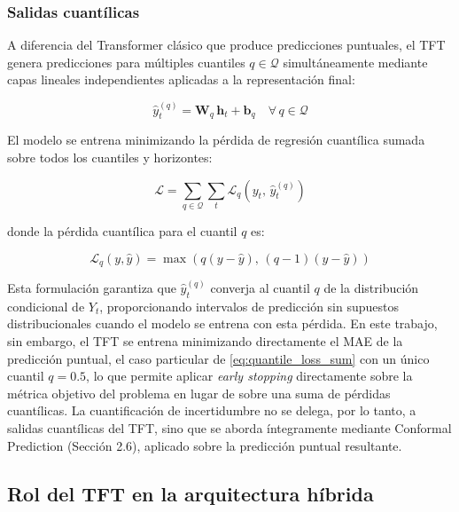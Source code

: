 \subsubsection{Salidas cuantílicas}

A diferencia del Transformer clásico que produce predicciones puntuales, el TFT genera predicciones para múltiples cuantiles $q \in \mathcal{Q}$ simultáneamente mediante capas lineales independientes aplicadas a la representación final:

\begin{equation}
\hat{y}_t^{(q)} = \mathbf{W}_q \, \mathbf{h}_t + \mathbf{b}_q \quad \forall\, q \in \mathcal{Q}
\end{equation}

El modelo se entrena minimizando la pérdida de regresión cuantílica sumada sobre todos los cuantiles y horizontes:

\begin{equation}
\mathcal{L} = \sum_{q \in \mathcal{Q}} \sum_{t} \mathcal{L}_q\left(y_t, \, \hat{y}_t^{(q)}\right)
\label{eq:quantile_loss_sum}
\end{equation}

donde la pérdida cuantílica para el cuantil $q$ es:

\begin{equation}
\mathcal{L}_q(y, \hat{y}) = \max\left(q(y - \hat{y}), \, (q-1)(y - \hat{y})\right)
\end{equation}

Esta formulación garantiza que $\hat{y}_t^{(q)}$ converja al cuantil $q$ de la distribución condicional de $Y_t$, proporcionando intervalos de predicción sin supuestos distribucionales cuando el modelo se entrena con esta pérdida. En este trabajo, sin embargo, el TFT se entrena minimizando directamente el MAE de la predicción puntual, el caso particular de \eqref{eq:quantile_loss_sum} con un único cuantil $q=0.5$, lo que permite aplicar \textit{early stopping} directamente sobre la métrica objetivo del problema en lugar de sobre una suma de pérdidas cuantílicas. La cuantificación de incertidumbre no se delega, por lo tanto, a salidas cuantílicas del TFT, sino que se aborda íntegramente mediante Conformal Prediction (Sección 2.6), aplicado sobre la predicción puntual resultante.

\subsection{Rol del TFT en la arquitectura híbrida}

